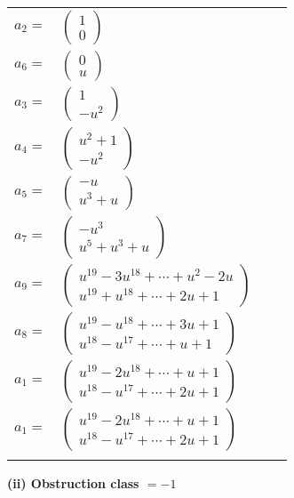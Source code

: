 \documentclass[1p]{elsarticle_modified}
\theoremstyle{definition}
\begin{document}
\begin{tabular}{m{7pt} m{180pt} m{7pt} m{180pt} }
\flushright $a_{2}=$&$\begin{pmatrix}1\\0\end{pmatrix}$ \\
\flushright $a_{6}=$&$\begin{pmatrix}0\\u\end{pmatrix}$ \\
\flushright $a_{3}=$&$\begin{pmatrix}1\\- u^2\end{pmatrix}$ \\
\flushright $a_{4}=$&$\begin{pmatrix}u^2+1\\- u^2\end{pmatrix}$ \\
\flushright $a_{5}=$&$\begin{pmatrix}- u\\u^3+u\end{pmatrix}$ \\
\flushright $a_{7}=$&$\begin{pmatrix}- u^3\\u^5+u^3+u\end{pmatrix}$ \\
\flushright $a_{9}=$&$\begin{pmatrix}u^{19}-3 u^{18}+\cdots+u^2-2 u\\u^{19}+u^{18}+\cdots+2 u+1\end{pmatrix}$ \\
\flushright $a_{8}=$&$\begin{pmatrix}u^{19}- u^{18}+\cdots+3 u+1\\u^{18}- u^{17}+\cdots+u+1\end{pmatrix}$ \\
\flushright $a_{1}=$&$\begin{pmatrix}u^{19}-2 u^{18}+\cdots+u+1\\u^{18}- u^{17}+\cdots+2 u+1\end{pmatrix}$\\ \flushright $a_{1}=$&$\begin{pmatrix}u^{19}-2 u^{18}+\cdots+u+1\\u^{18}- u^{17}+\cdots+2 u+1\end{pmatrix}$\\&\end{tabular}
\flushleft \textbf{(ii) Obstruction class $= -1$}\\~\\
\end{document}
